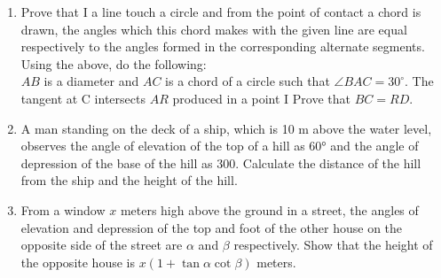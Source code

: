 \begin{enumerate}
\item Prove that I a line touch a circle and from the point of contact a chord is drawn, the angles
which this chord makes with the given line are equal respectively to the angles formed in the
corresponding alternate segments.
Using the above, do the following: \\
$AB$ is a diameter and $AC$ is a chord of a circle such that $\angle BAC=30^\circ$. The tangent at C
intersects $AR$ produced in a point I Prove that $BC = RD.$

\item A man standing on the deck of a ship, which is 10 m above the water level, observes the
angle of elevation of the top of a hill as 60° and the angle of depression of the base of the hill as
300. Calculate the distance of the hill from the ship and the height of the hill.

\item From a window $x$ meters high above the ground in a street, the angles of elevation and depression of the top and foot of the other house on the opposite side of the street are $\alpha$ and $\beta$ respectively. Show that the height of the opposite house is $x(1 + \tan \alpha \cot \beta)$ meters.






\end{enumerate}
